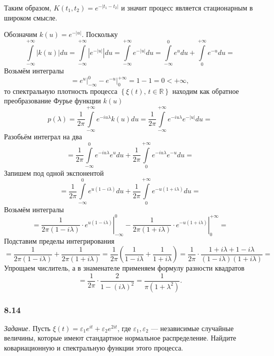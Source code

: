 Таким образом, $K \left( t_1, t_2 \right) = e^{-\left| t_1 - t_2 \right| }$
и значит процесс является стационарным в широком смысле.

Обозначим $k \left( u \right) = e^{-\left| u \right| }$.
Поскольку
$$ \int \limits_{-\infty }^{+\infty } \left| k \left( u \right) \right| du =
  \int \limits_{-\infty }^{+\infty } \left| e^{-\left| u \right| } \right| du =
  \int \limits_{-\infty }^{+\infty } e^{-\left| u \right| } du =
  \int \limits_{-\infty }^0 e^u du + \int \limits_0^{+\infty } e^{-u} du =$$
Возьмём интегралы
$$= \left. e^u \right|_{-\infty }^0 - \left. e^{-u} \right|_0^{+\infty } =
  1 - 1 =
  0 <
  + \infty,$$
то спектральную плотность процесса $ \left\{ \xi \left( t \right), \, t \in \mathbb{R} \right\} $
находим как обратное преобразование Фурье функции $k \left( u \right) $
$$p \left( \lambda \right) =
  \frac{1}{2 \pi } \int \limits_{-\infty }^{+\infty } e^{-iu \lambda } k \left( u \right) du =
  \frac{1}{2 \pi } \int \limits_{-\infty }^{+\infty } e^{-iu \lambda } e^{-\left| u \right| } du =$$
Разобьём интеграл на два
$$= \frac{1}{2 \pi } \int \limits_{-\infty }^0 e^{-iu \lambda } e^u du +
  \frac{1}{2 \pi } \int \limits_0^{+ \infty } e^{-iu \lambda } e^{-u} du =$$
Запишем под одной экспонентой
$$= \frac{1}{2 \pi } \int \limits_{-\infty }^0 e^{u \left( 1 - i \lambda \right) } du +
  \frac{1}{2 \pi } \int \limits_0^{+\infty } e^{-u \left( 1 + i \lambda \right) } du =$$
Возьмём интегралы
$$= \left.
    \frac{1}{2 \pi \left( 1 - i \lambda \right) } \cdot e^{u \left( 1 - i \lambda \right) }
  \right|_{-\infty }^0 -
  \left.
    \frac{1}{2 \pi \left( 1 + i \lambda \right) } \cdot e^{-u \left( 1 + i \lambda \right) }
  \right|_0^{+\infty } =$$
Подставим пределы интегрирования
$$= \frac{1}{2 \pi \left( 1 - i \lambda \right) } + \frac{1}{2 \pi \left( 1 + i \lambda \right) } =
  \frac{1}{2 \pi } \left( \frac{1}{1 - i \lambda } + \frac{1}{1 + i \lambda } \right) =
  \frac{1}{2 \pi } \cdot
  \frac{1 + i \lambda + 1 - i \lambda }{ \left( 1 - i \lambda \right) \left( 1 + i \lambda \right) } =$$
Упрощаем числитель, а в знаменателе применяем формулу разности квадратов
$$= \frac{1}{2 \pi } \cdot \frac{2}{1 - \left( i \lambda \right)^2} =
  \frac{1}{ \pi \left( 1 + \lambda^2 \right) }.$$

\subsubsection*{8.14}

\textit{Задание.}
Пусть $ \xi \left( t \right) = \varepsilon_1 e^{it} + \varepsilon_2 e^{2it}$,
где $ \varepsilon_1, \varepsilon_2$ --- независимые случайные величины,
которые имеют стандартное нормальное распределение.
Найдите ковариационную и спектральную функции этого процесса.

